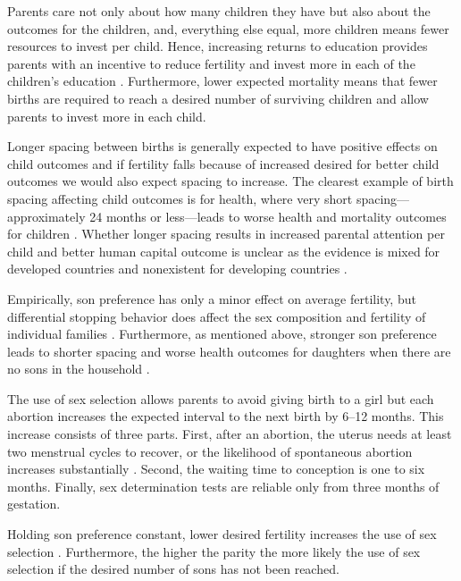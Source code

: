 Parents care not only about how many children they have but also about the outcomes
for the children, and, everything else equal, more children means fewer resources to 
invest per child.
Hence, increasing returns to education provides parents with an incentive to reduce 
fertility and invest more in each of the children's education \citep{Rosenzweig1982a}.
Furthermore, lower expected mortality means that fewer births are required to reach a 
desired number of surviving children and allow parents to invest more in each child.

Longer spacing between births is generally expected to have positive effects on 
child outcomes and if fertility falls because of increased desired for better child
outcomes we would also expect spacing to increase.
The clearest example of birth spacing affecting child outcomes is for health,
where very short spacing---approximately 24 months or less---leads to worse health 
and mortality outcomes for children 
\citep{Whitworth2002,Conde-Agudelo2006,Conde-Agudelo2012}.
Whether longer spacing results in increased parental attention per child and better 
human capital outcome is unclear as the evidence is mixed for developed countries and 
nonexistent for developing countries
\citep{Zajonc1975,Zajonc1976,Razin1980,Powell1993,Pettersson-Lidbom2009,Buckles2012,Barclay2017}.


Empirically, son preference has only a minor effect on average fertility, but
differential stopping behavior does affect the sex composition and fertility of
individual families \citet{repetto72,leung94,clark00,Basu2010,Barcellos2014}. 
Furthermore, as mentioned above, stronger son preference leads to shorter spacing and  
worse health outcomes for daughters when there are no sons in the household 
\citep{Whitworth2002,Bhalotra2008,Maitra2008,Jayachandran2011,Jayachandran2017a}.

The use of sex selection allows parents to avoid giving birth to a girl but each
abortion increases the expected interval to the next birth by 6--12 months.
This increase consists of three parts. 
First, after an abortion, the uterus needs at least two menstrual cycles to recover, 
or the likelihood of spontaneous abortion increases substantially \citep{zhou00b}. 
Second, the waiting time to conception is one to six months. 
Finally, sex determination tests are reliable only from three months of gestation. 

Holding son preference constant, lower desired fertility increases the use of sex 
selection \citep{Portner2015b,Jayachandran2017}.  
Furthermore, the higher the parity the more likely the use of sex selection if the 
desired number of sons has not been reached.


